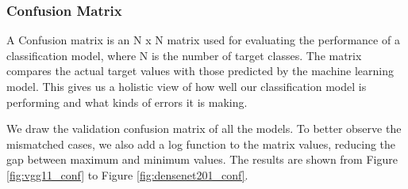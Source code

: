 \subsubsection{Confusion Matrix}
A Confusion matrix is an N x N matrix used for evaluating the performance of a classification model, where N is the number of target classes. The matrix compares the actual target values with those predicted by the machine learning model. This gives us a holistic view of how well our classification model is performing and what kinds of errors it is making\cite{conf_matrix}.

We draw the validation confusion matrix of all the models. To better observe the mismatched cases, we also add a log function to the matrix values, reducing the gap between maximum and minimum values. The results are shown from Figure \ref{fig:vgg11_conf} to Figure \ref{fig:densenet201_conf}.

